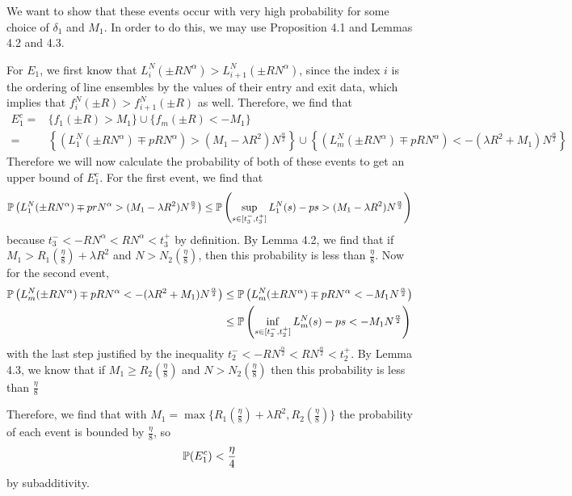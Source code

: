 	We want to show that these events occur with very high probability for some choice of $\delta_1$ and $M_1$. In order to do this, we may use Proposition 4.1 and Lemmas 4.2 and 4.3. 
	
	For $E_1$,  we first know that $L_i^N(\pm RN^\alpha)> L_{i+1}^N(\pm RN^\alpha)$, since the index $i$ is the ordering of line ensembles by the values of their entry and exit data, which implies that $f_i^N(\pm R)>f_{i+1}^N(\pm R)$ as well. Therefore, we find that
	\begin{align*}
	E_1^c=&\{f_1(\pm R)> M_1\} \cup \{f_m(\pm R)<-M_1\} \\
	=&\left\{ \left(L_1^N(\pm RN^\alpha)\mp pRN^\alpha\right)> (M_1-\lambda R^2)N^{\frac \alpha 2}\right\} \cup \left\{\left(L_m^N(\pm RN^\alpha)\mp pRN^\alpha\right)< -(\lambda R^2+M_1)N^{\frac\alpha 2}\right\}
	\end{align*}
	Therefore we will now calculate the probability of both of these events to get an upper bound of $E_1^c$. For the first event, we find that $$
	\mathbb{P}\left(L_1^N(\pm RN^\alpha)\mp prN^\alpha>(M_1-\lambda R^2)N^{\frac\alpha2}\right)
	\leq\mathbb{P}\left(\sup_{s\in[t_3^-,t_3^+]}L_1^N(s)-ps>(M_1-\lambda R^2)N^{\frac\alpha 2}\right)
	$$ because $t_3^-<-RN^\alpha<RN^\alpha<t_3^+$ by definition. By Lemma 4.2, we find that if $M_1>R_1(\frac{\eta}{8})+\lambda R^2$ and $N>N_2(\frac\eta 8)$, then this probability is less than $\frac\eta 8$.
	Now for the second event, \begin{align*}
	\mathbb{P} \left(L_m^N(\pm RN^\alpha)\mp pRN^\alpha< -(\lambda R^2+M_1)N^{\frac\alpha 2}\right)&\leq \mathbb{P} \left(L_m^N(\pm RN^\alpha)\mp pRN^\alpha< -M_1N^{\frac\alpha 2}\right)\\
	&\leq \mathbb{P}\left(\inf_{s\in[t_2^-,t_2^+]}L_m^N(s)-ps<-M_1N^{\frac{\alpha}{2}}\right)
	\end{align*}
	with the last step justified by the inequality $t_2^-<-RN^{\frac{\alpha}{2}}<RN^{\frac{\alpha}{2}}<t_2^+$. By Lemma 4.3, we know that if $M_1\geq R_2(\frac{\eta}{8})$ and $N>N_2(\frac{\eta}{8})$ then this probability is less than $\frac{\eta}{8}$
	
	Therefore, we find that with $M_1=\max\{R_1(\frac{\eta}{8})+\lambda R^2,R_2(\frac\eta8)\}$ the probability of each event is bounded by $\frac{\eta}8$, so $$\mathbb{P}(E_1^c)<\frac{\eta}{4}$$ by subadditivity.
	
